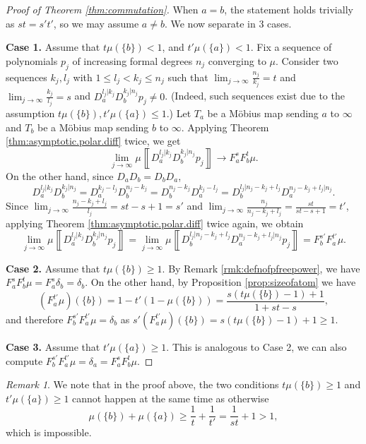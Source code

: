 \documentclass[reqno,11pt]{amsart}
\theoremstyle{remark}
\newtheorem{remark}[theorem]{Remark}
\newcommand{\polar}[1]{D_{#1}}
\newcommand{\polars}[3]{D_{#1}^{#2|#3}}
\newcommand{\pfreepower}[2]{F_{#1}^{#2}}
\newcommand{\meas}[1]{\mu \left\llbracket #1 \right\rrbracket}
\begin{document}
\begin{proof}[Proof of Theorem  \ref{thm:commutation}]
When $ a=b $, the statement holds trivially as $ st=s't' $, so we may assume $a\neq b$. We now separate in 3 cases.

\textbf{Case 1.} Assume that $t\mu(\{b\})<1$, and $t'\mu(\{a\})< 1 $.  Fix a sequence of polynomials $p_j$ of increasing formal degrees $n_j$ converging to $\mu$. Consider two sequences $k_j,l_j$ with $1\leq l_j < k_j\leq n_j$ such that $ \lim_{j\to\infty} \frac{n_j}{k_j}=t $ and $ \lim_{j\to\infty} \frac{k_j}{l_j} =s$ and $  \polars{a}{l_j}{k_j}\polars{b}{k_j}{n_j} p_j \neq 0$. (Indeed, such sequences exist due to the assumption $t\mu(\{b\}), t'\mu(\{a\})\leq 1 $.) Let $T_a$ be a Möbius map sending $a$ to $\infty$ and $T_b$ be a Möbius map sending $b$ to $\infty$. Applying Theorem \ref{thm:asymptotic.polar.diff} twice, we get $$ \lim_{j\to \infty}\meas{\polars{a}{l_j}{k_j}\polars{b}{k_j}{n_j} p_j}\to \pfreepower{a}{s}\pfreepower{b}{t}\mu. $$ 
On the other hand, since $\polar{a}\polar{b}=\polar{b}\polar{a}$, 
$$\polars{a}{l_j}{k_j}\polars{b}{k_j}{n_j}= \polar{a}^{k_j-l_j}\polar{b}^{n_j-k_j } = \polar{b}^{n_j-k_j }\polar{a}^{k_j-l_j} = \polars{b}{l_j}{n_j-k_j+l_j}\polars{a}{n_j-k_j+l_j}{n_j}.$$
Since $ \lim_{j\to \infty} \frac{n_j-k_j+l_j}{l_j} = st-s+1=s' $ and $ \lim_{j\to \infty}\frac{ n_j}{n_j-k_j+l_j} = \frac{st}{st-s+1} =t' $, applying Theorem \ref{thm:asymptotic.polar.diff} twice again, we obtain 
$$ \lim_{j\to \infty} \meas{\polars{a}{l_j}{k_j}\polars{b}{k_j}{n_j}p_j} = \lim_{j\to \infty}  \meas{\polars{b}{l_j}{n_j-k_j+l_j}\polars{a}{n_j-k_j+l_j}{n_j}p_j} = \pfreepower{b}{s'}\pfreepower{a}{t'}\mu.$$

\textbf{Case 2.} Assume that $ t\mu(\{b\}) \geq 1 $. By Remark \ref{rmk:defnofpfreepower}, we have $ \pfreepower{a}{s}\pfreepower{b}{t}\mu = \pfreepower{a}{s}\delta_b = \delta_b $. On the other hand, by Proposition \ref{prop:sizeofatom} we have $$ (\pfreepower{a}{t'}\mu)(\{b\}) = 1-t'( 1-\mu(\{b\}) )= \frac{s(t\mu(\{b\})-1)+1}{1+st-s},$$
and therefore $\pfreepower{b}{s'}\pfreepower{a}{t'}\mu = \delta_b$ as $ s'(\pfreepower{a}{t'}\mu)(\{b\})= s(t\mu(\{b\})-1)+1\geq 1$.

\textbf{Case 3.} Assume that $ t'\mu(\{a\})\geq 1 $. This is analogous to Case 2, we can also compute $ \pfreepower{b}{s'}\pfreepower{a}{t'}\mu = \delta_a= \pfreepower{a}{s}\pfreepower{b}{t}\mu $.
\end{proof}

\begin{remark}
    We note that in the proof above, the two conditions $  t\mu(\{b\}) \geq 1  $ and $ t'\mu(\{a\})\geq 1 $ cannot happen at the same time as otherwise $$ \mu(\{b\})+\mu(\{a\}) \geq \frac{1}{t}+\frac{1}{t'} = \frac{1}{st}+1 >1,$$
    which is impossible.
\end{remark}
\end{document}
